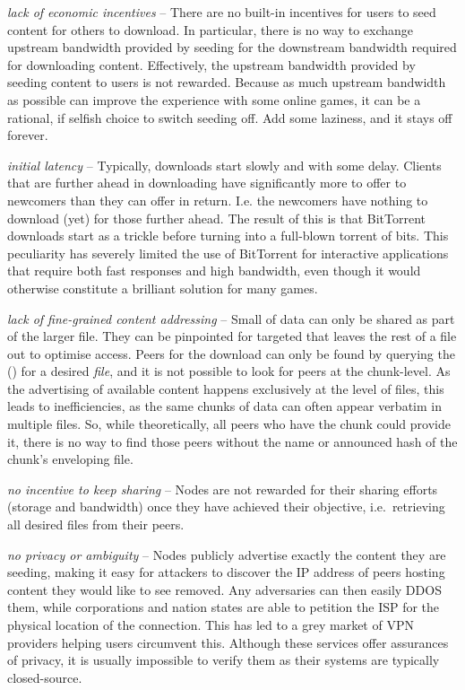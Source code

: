 \begin{labelledlist}
\item \emph{lack of economic incentives} -- 
There are no built-in incentives for users to seed content for others to download. In particular, there is no way to exchange upstream bandwidth provided by seeding for the downstream bandwidth required for downloading content. Effectively, the upstream bandwidth provided by seeding content to users is not rewarded. Because as much upstream bandwidth as possible can improve the experience with some online games, it can be a rational, if selfish choice to switch seeding off. Add some laziness, and it stays off forever.

\item \emph{initial latency} -- 
 Typically, downloads start slowly and with some delay. Clients that are further ahead in downloading have significantly more to offer to newcomers than they can offer in return. I.e. the newcomers have nothing to download (yet) for those further ahead. The result of this is that BitTorrent downloads start as a trickle before turning into a full-blown torrent of bits. This peculiarity has severely limited the use of BitTorrent for interactive applications that require both fast responses and high bandwidth, even though it would otherwise constitute a brilliant solution for many games.
 
\item \emph{lack of fine-grained content addressing} -- Small  of data can only be shared as part of the larger file. They can be pinpointed for targeted that leaves the rest of a file out to optimise access. Peers for the download can only be found by querying the  () for a desired \emph{file}, and it is not possible to look for peers at the chunk-level. As the advertising of available content happens exclusively at the level of files, this leads to inefficiencies, as the same chunks of data can often appear verbatim in multiple files. So, while theoretically, all peers who have the chunk could provide it, there is no way to find those peers without the name or announced hash of the chunk's enveloping file.

\item \emph{no incentive to keep sharing} --
Nodes are not rewarded for their sharing efforts (storage and bandwidth) once they have achieved their objective, i.e.\ retrieving all desired files from their peers.

\item \emph{no privacy or ambiguity} --
Nodes publicly advertise exactly the content they are seeding, making it easy for attackers to discover the IP address of peers hosting content they would like to see removed. Any adversaries can then easily DDOS them, while corporations and nation states are able to petition the ISP for the physical location of the connection. This has led to a grey market of VPN providers helping users circumvent this. Although these services offer assurances of privacy, it is usually impossible to verify them as their systems are typically closed-source. 
\end{labelledlist}

